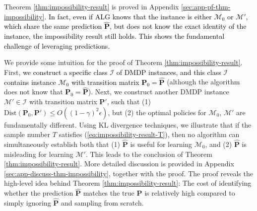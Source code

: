 \documentclass[12pt]{article}
\begin{document}
Theorem \ref{thm:impossibility-result} is proved in Appendix \ref{sec:app-pf-thm-impossibility}. 
\textcolor{black}{In fact, even if ALG knows that the instance is either $\mathcal{M}_0$ or $\mathcal{M}'$, which share the same prediction $\hat{\boldsymbol{\text{P}}}$, but does not know the exact identity of the instance, the impossibility result still holds. This shows the fundamental challenge of leveraging predictions.}

We provide some intuition for the proof of Theorem \ref{thm:impossibility-result}. First, \textcolor{black}{we construct a specific class $\mathcal{I}$ of DMDP instances, and this class $\mathcal{I}$ contains instance $\mathcal{M}_0$ with transition matrix $\boldsymbol{\text{P}}_0 = \hat{\boldsymbol{\text{P}}}$} %
(although the algorithm does not know that %
\textcolor{black}{$\boldsymbol{\text{P}}_0 = \hat{\boldsymbol{\text{P}}}$}). Next, we construct another DMDP instance $\mathcal{M}' \in \mathcal{I}$ with transition matrix $\boldsymbol{\text{P}}'$, such that (1) $\text{Dist}(\boldsymbol{\text{P}}_0,\boldsymbol{\text{P}}') \le O ((1-\gamma)^2 \epsilon)$, but (2) the optimal policies for $\mathcal{M}_0$, $\mathcal{M}'$ are fundamentally different. Using KL divergence techniques, we illustrate that if the sample number $T$ satisfies (\ref{eq:impossibility-result-T}), then no algorithm can simultaneously establish both that (1) $\hat{\boldsymbol{\text{P}}}$ is useful for learning $\mathcal{M}_0$, and (2) $\hat{\boldsymbol{\text{P}}}$ is misleading for learning $\mathcal{M}'$. This leads to the conclusion of Theorem \ref{thm:impossibility-result}. More detailed discussion is provided in Appendix \ref{sec:app-discuss-thm-impossibility}, together with the proof. The proof reveals the high-level idea behind Theorem \ref{thm:impossibility-result}: The cost of identifying whether the prediction $\hat{\boldsymbol{\text{P}}}$ matches the true $\boldsymbol{\text{P}}$ is relatively high compared to simply ignoring $\hat{\boldsymbol{\text{P}}}$ and sampling from scratch.
\end{document}
